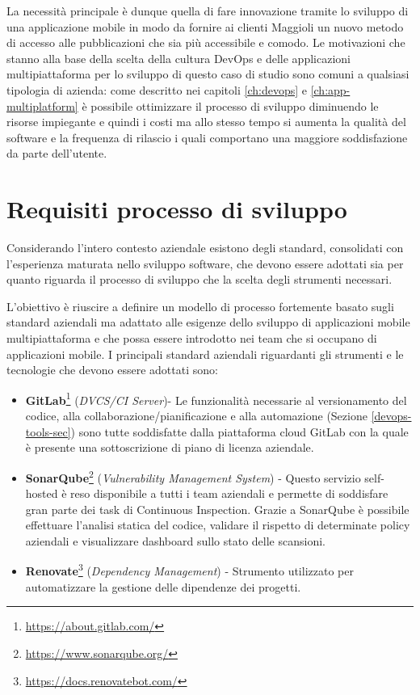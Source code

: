 La necessità principale è dunque quella di fare innovazione tramite lo sviluppo di una applicazione mobile in modo da fornire ai clienti Maggioli un nuovo metodo di accesso alle pubblicazioni che sia più accessibile e comodo. Le motivazioni che stanno alla base della scelta della cultura DevOps e delle applicazioni multipiattaforma per lo sviluppo di questo caso di studio sono comuni a qualsiasi tipologia di azienda: come descritto nei capitoli \ref{ch:devops} e \ref{ch:app-multiplatform} è possibile ottimizzare il processo di sviluppo diminuendo le risorse impiegante e quindi i costi ma allo stesso tempo si aumenta la qualità del software e la frequenza di rilascio i quali comportano una maggiore soddisfazione da parte dell'utente.

\section{Requisiti processo di sviluppo}
Considerando l'intero contesto aziendale esistono degli standard, consolidati con l'esperienza maturata nello sviluppo software, che devono essere adottati sia per quanto riguarda il processo di sviluppo che la scelta degli strumenti necessari.

L'obiettivo è riuscire a definire un modello di processo fortemente basato sugli standard aziendali ma adattato alle esigenze dello sviluppo di applicazioni mobile multipiattaforma e che possa essere introdotto nei team che si occupano di applicazioni mobile. I principali standard aziendali riguardanti gli strumenti e le tecnologie che devono essere adottati sono:

\begin{itemize}
    \item \textbf{GitLab}\footnote{\href{https://about.gitlab.com/}{https://about.gitlab.com/}} (\textit{DVCS/CI Server})- Le funzionalità necessarie al versionamento del codice, alla collaborazione/pianificazione e alla automazione (Sezione \ref{devops-tools-sec}) sono tutte soddisfatte dalla piattaforma cloud GitLab con la quale è presente una sottoscrizione di piano di licenza aziendale.
    \item \textbf{SonarQube}\footnote{\href{https://www.sonarqube.org/}{https://www.sonarqube.org/}} (\textit{Vulnerability Management System}) - Questo servizio self-hosted è reso disponibile a tutti i team aziendali e permette di soddisfare gran parte dei task di Continuous Inspection. Grazie a SonarQube è possibile effettuare l'analisi statica del codice, validare il rispetto di determinate policy aziendali e visualizzare dashboard sullo stato delle scansioni.
    \item \textbf{Renovate}\footnote{\href{https://docs.renovatebot.com/}{https://docs.renovatebot.com/}} (\textit{Dependency Management}) - Strumento utilizzato per automatizzare la gestione delle dipendenze dei progetti. 
\end{itemize}

